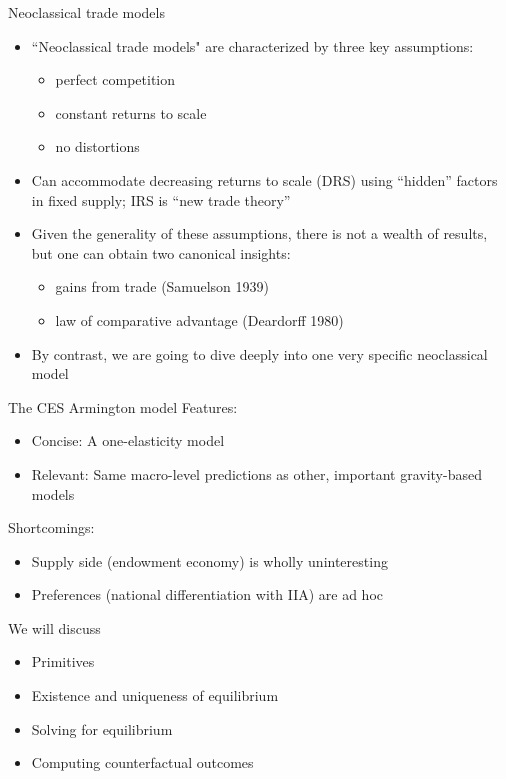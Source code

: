 \documentclass[10pt,notes=hide]{beamer}
\begin{document}
\begin{frame}{Neoclassical trade models}
\begin{itemize}
\item ``Neoclassical trade models" are characterized by three key
assumptions:
\begin{itemize}
	\item perfect competition
	\item constant returns to scale
	\item no distortions
\end{itemize}
\item Can accommodate decreasing returns to scale (DRS) using ``hidden'' factors in fixed supply;
IRS is ``new trade theory''
\item Given the generality of these assumptions, there is not a wealth of results, but one can obtain two canonical insights: 
\begin{itemize}
	\item gains from trade (Samuelson 1939)
	\item law of comparative advantage (Deardorff 1980)
\end{itemize}
\item By contrast, we are going to dive deeply into one very specific neoclassical model
\end{itemize}
\end{frame}
\begin{frame}{The CES Armington model}
Features:
\begin{itemize}
\item Concise: A one-elasticity model
\item Relevant: Same macro-level predictions as other, important gravity-based models
\end{itemize}
Shortcomings:
\begin{itemize}
\item Supply side (endowment economy) is wholly uninteresting 
\item Preferences (national differentiation with IIA) are ad hoc
\end{itemize}
We will discuss
\begin{itemize}
\item Primitives
\item Existence and uniqueness of equilibrium
\item Solving for equilibrium
\item Computing counterfactual outcomes
\end{itemize}
\end{frame}
\end{document}
